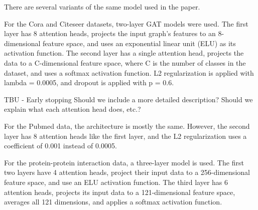 There are several variants of the same model used in the paper.

For the Cora and Citeseer datasets, two-layer GAT models were used.  The first
layer has 8 attention heads, projects the input graph's features to an
8-dimensional feature space, and uses an exponential linear unit (ELU) as its
activation function.  The second layer has a single attention head, projects
the data to a C-dimensional feature space, where C is the number of classes in
the dataset, and uses a softmax activation function.  L2 regularization is
applied with lambda = 0.0005, and dropout is applied with p = 0.6.

TBU - Early stopping
Should we include a more detailed description? Should we explain what each
attention head does, etc.?

For the Pubmed data, the architecture is mostly the same. However, the second
layer has 8 attention heads like the first layer, and the L2 regularization
uses a coefficient of 0.001 instead of 0.0005.

For the protein-protein interaction data, a three-layer model is used. The
first two layers have 4 attention heads, project their input data to a
256-dimensional feature space, and use an ELU activation function. The third
layer has 6 attention heads, projects its input data to a 121-dimensional
feature space, averages all 121 dimensions, and applies a softmax activation
function.
